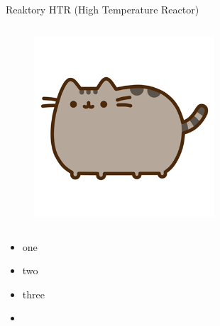 \begin{columnframe}{Reaktory HTR (High Temperature Reactor)}
    \begin{column}{0.5\textwidth}
        \begin{figure}
            \centering
            \includegraphics[width=0.6\textwidth, frame]{images/pusheen.png}
        \end{figure}
    \end{column}
    \begin{column}{0.5\textwidth}
        \begin{itemize}
            \item one \keV
            \item two \MeV
            \item three \GeV
            \item \aegis
        \end{itemize}
    \end{column}
\end{columnframe}

